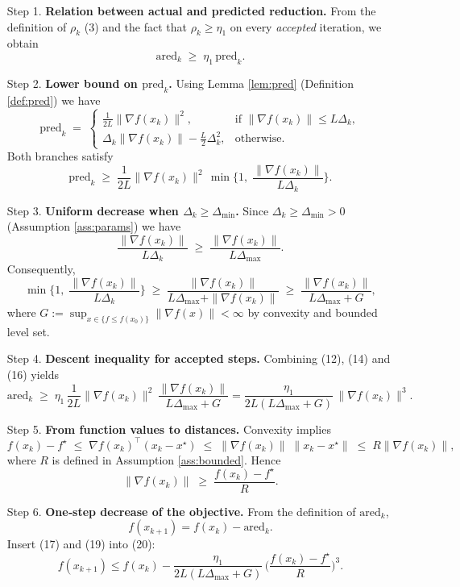 \documentclass{article}
\begin{document}
\begin{enumerate}
\item[Step 1.] \textbf{Relation between actual and predicted reduction.}  
From the definition of $\rho_k$ (3) and the fact that $\rho_k\ge \eta_1$ on every \emph{accepted} iteration, we obtain
\[
\text{ared}_k \;\ge\; \eta_1\,\text{pred}_k .
\tag{12}
\]

\item[Step 2.] \textbf{Lower bound on $\text{pred}_k$.}  
Using Lemma \ref{lem:pred} (Definition \ref{def:pred}) we have
\[
\text{pred}_k \;=\;
\begin{cases}
\displaystyle\frac{1}{2L}\|\nabla f(x_k)\|^{2}, & \text{if }\|\nabla f(x_k)\|\le L\Delta_k,\\[6pt]
\displaystyle\Delta_k\|\nabla f(x_k)\|-\frac{L}{2}\Delta_k^{2}, & \text{otherwise}.
\end{cases}
\tag{13}
\]
Both branches satisfy
\[
\text{pred}_k \;\ge\; \frac{1}{2L}\|\nabla f(x_k)\|^{2}\,
\min\!\Big\{1,\;\frac{\|\nabla f(x_k)\|}{L\Delta_k}\Big\}.
\tag{14}
\]

\item[Step 3.] \textbf{Uniform decrease when $\Delta_k\ge \Delta_{\min}$.}  
Since $\Delta_k\ge\Delta_{\min}>0$ (Assumption \ref{ass:params}) we have
\[
\frac{\|\nabla f(x_k)\|}{L\Delta_k}\;\ge\; \frac{\|\nabla f(x_k)\|}{L\Delta_{\max}}.
\tag{15}
\]
Consequently,
\[
\min\!\Big\{1,\;\frac{\|\nabla f(x_k)\|}{L\Delta_k}\Big\}
\;\ge\;
\frac{\|\nabla f(x_k)\|}{L\Delta_{\max}+ \|\nabla f(x_k)\|}\;
\ge\;
\frac{\|\nabla f(x_k)\|}{L\Delta_{\max}+G},
\tag{16}
\]
where $G:=\sup_{x\in\{f\le f(x_0)\}}\|\nabla f(x)\|<\infty$ by convexity and bounded level set.

\item[Step 4.] \textbf{Descent inequality for accepted steps.}  
Combining (12), (14) and (16) yields
\[
\text{ared}_k
\;\ge\;
\eta_1\,
\frac{1}{2L}\|\nabla f(x_k)\|^{2}\,
\frac{\|\nabla f(x_k)\|}{L\Delta_{\max}+G}
=
\frac{\eta_1}{2L(L\Delta_{\max}+G)}\,
\|\nabla f(x_k)\|^{3}.
\tag{17}
\]

\item[Step 5.] \textbf{From function values to distances.}  
Convexity implies
\[
f(x_k)-f^\star \;\le\; \nabla f(x_k)^{\top}(x_k-x^\star)
\;\le\; \|\nabla f(x_k)\|\;\|x_k-x^\star\|
\;\le\; R\|\nabla f(x_k)\|,
\tag{18}
\]
where $R$ is defined in Assumption \ref{ass:bounded}.  Hence
\[
\|\nabla f(x_k)\|\;\ge\;\frac{f(x_k)-f^\star}{R}.
\tag{19}
\]

\item[Step 6.] \textbf{One‑step decrease of the objective.}  
From the definition of $\text{ared}_k$,
\[
f(x_{k+1}) = f(x_k)-\text{ared}_k .
\tag{20}
\]
Insert (17) and (19) into (20):
\[
f(x_{k+1}) \le 
f(x_k) -
\frac{\eta_1}{2L(L\Delta_{\max}+G)}\,
\Big(\frac{f(x_k)-f^\star}{R}\Big)^{3}.
\tag{21}
\]


\end{enumerate}
\end{document}
